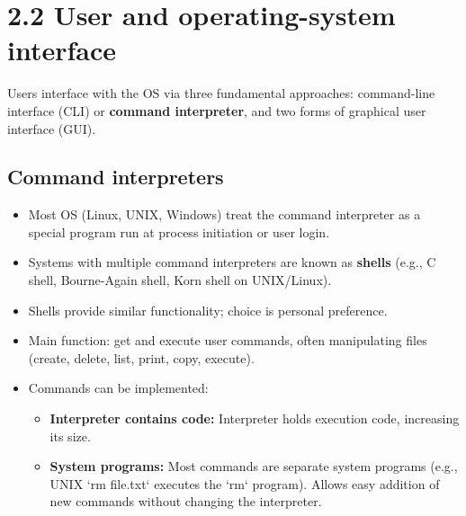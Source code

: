 \section*{2.2 User and operating-system interface}

Users interface with the OS via three fundamental approaches: command-line interface (CLI) or \textbf{command interpreter}, and two forms of graphical user interface (GUI).

\subsection*{Command interpreters}
\begin{itemize}
    \item Most OS (Linux, UNIX, Windows) treat the command interpreter as a special program run at process initiation or user login.
    \item Systems with multiple command interpreters are known as \textbf{shells} (e.g., C shell, Bourne-Again shell, Korn shell on UNIX/Linux).
    \item Shells provide similar functionality; choice is personal preference.
    \item Main function: get and execute user commands, often manipulating files (create, delete, list, print, copy, execute).
    \item Commands can be implemented:
    \begin{itemize}
        \item \textbf{Interpreter contains code:} Interpreter holds execution code, increasing its size.
        \item \textbf{System programs:} Most commands are separate system programs (e.g., UNIX `rm file.txt` executes the `rm` program). Allows easy addition of new commands without changing the interpreter.
    \end{itemize}
\end{itemize}

